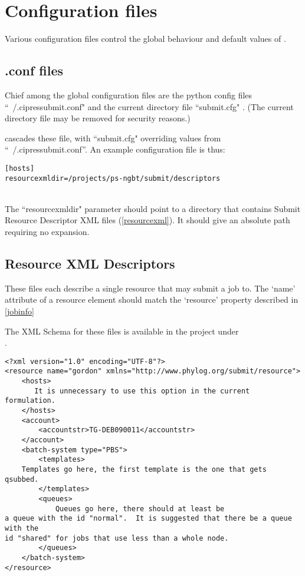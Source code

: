 \section{Configuration files}
Various configuration files control the global behaviour and default values of \theprog .

\subsection{.conf files}
Chief among the global configuration files are the python config files ``~/.cipressubmit.conf" and the current directory file ``submit.cfg" . (The current directory file may be removed for security reasons.)

\theprog cascades these file, with ``submit.cfg" overriding values from ``~/.cipressubmit.conf''. An example configuration file is thus:
~\\
\begin{verbatim}
[hosts]
resourcexmldir=/projects/ps-ngbt/submit/descriptors
\end{verbatim}
~\\
The ``resourcexmldir" parameter should point to a directory that contains Submit Resource Descriptor XML files (\ref{resourcexml}). It should give an absolute path requiring no expansion.

\subsection{Resource XML Descriptors\label{resourcexml}}
These files each describe a single resource that \theprog may submit a job to.
The `name' attribute of a resource element should match the `resource' property described in  \ref{jobinfo}

The XML Schema for these files is available in the project under\\ .

\lstset{language=XML}
\begin{lstlisting}[caption={General layout of a resource descriptor}]
<?xml version="1.0" encoding="UTF-8"?>
<resource name="gordon" xmlns="http://www.phylog.org/submit/resource">
	<hosts>
	   It is unnecessary to use this option in the current formulation.
	</hosts>
	<account>
		<accountstr>TG-DEB090011</accountstr>
	</account>
	<batch-system type="PBS">
		<templates>
	Templates go here, the first template is the one that gets qsubbed.
		</templates>
		<queues>
			Queues go here, there should at least be
a queue with the id "normal".  It is suggested that there be a queue with the
id "shared" for jobs that use less than a whole node.
		</queues>
	</batch-system>
</resource>
\end{lstlisting}

